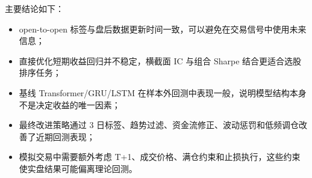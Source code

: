 \documentclass[fontset=mac]{ctexart}
\begin{document}
主要结论如下：
\begin{itemize}[noitemsep]
    \item open-to-open 标签与盘后数据更新时间一致，可以避免在交易信号中使用未来信息；
    \item 直接优化短期收益回归并不稳定，横截面 IC 与组合 Sharpe 结合更适合选股排序任务；
    \item 基线 Transformer/GRU/LSTM 在样本外回测中表现一般，说明模型结构本身不是决定收益的唯一因素；
    \item 最终改进策略通过 3 日标签、趋势过滤、资金流修正、波动惩罚和低频调仓改善了近期回测表现；
    \item 模拟交易中需要额外考虑 T+1、成交价格、满仓约束和止损执行，这些约束使实盘结果可能偏离理论回测。
\end{itemize}



\end{document}
